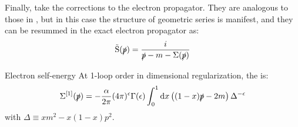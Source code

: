 Finally, take the corrections to the electron propagator. They are analogous to those in , but in this case the structure of geometric series is manifest, and they can be resummed in the exact electron propagator as:
\begin{equation}
  \tilde{\text{S}}(\slashed{p}) = \frac{i}{\slashed{p} - m - \Sigma(\slashed{p})}
  \label{eq:exact-self-energy}
\end{equation}

\begin{proposition}{Electron self-energy}{}
  At 1-loop order in dimensional regularization, the  is:
  \begin{equation}
    \Sigma^{[1]}(\slashed{p}) = - \frac{\alpha}{2\pi} (4\pi)^\epsilon \Gamma(\epsilon) \int_0^1 \mathrm{d} x \left( (1-x) \slashed{p} - 2m \right) \Delta^{-\epsilon}
  \end{equation}
  with $ \Delta \equiv x m^2 - x (1 - x) p^2 $.
\end{proposition}

